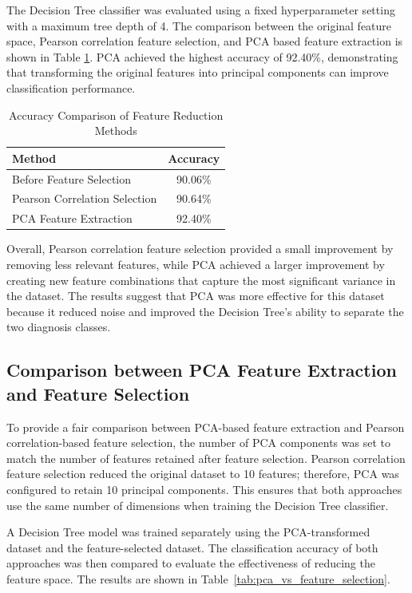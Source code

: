 \documentclass[a4paper,12pt]{article}
\begin{document}
The Decision Tree classifier was evaluated using a fixed hyperparameter setting with a maximum tree depth of 4. The comparison between the original feature space, Pearson correlation feature selection, and PCA based feature extraction is shown in Table \ref{tab:pca_accuracy}. PCA achieved the highest accuracy of 92.40\%, demonstrating that transforming the original features into principal components can improve classification performance.

\begin{table}
	\centering
	\begin{tabular}{l c}
		\hline
		\textbf{Method} & \textbf{Accuracy} \\
		\hline
		Before Feature Selection & 90.06\% \\
		Pearson Correlation Selection & 90.64\% \\
		PCA Feature Extraction & 92.40\% \\
		\hline
	\end{tabular}
	\caption{Accuracy Comparison of Feature Reduction Methods}
	\label{tab:pca_accuracy}
\end{table}

Overall, Pearson correlation feature selection provided a small improvement by removing less relevant features, while PCA achieved a larger improvement by creating new feature combinations that capture the most significant variance in the dataset. The results suggest that PCA was more effective for this dataset because it reduced noise and improved the Decision Tree's ability to separate the two diagnosis classes.

\subsection{Comparison between PCA Feature Extraction and Feature Selection}

To provide a fair comparison between PCA-based feature extraction and Pearson correlation-based feature selection, the number of PCA components was set to match the number of features retained after feature selection. Pearson correlation feature selection reduced the original dataset to 10 features; therefore, PCA was configured to retain 10 principal components. This ensures that both approaches use the same number of dimensions when training the Decision Tree classifier.

A Decision Tree model was trained separately using the PCA-transformed dataset and the feature-selected dataset. The classification accuracy of both approaches was then compared to evaluate the effectiveness of reducing the feature space. The results are shown in Table~\ref{tab:pca_vs_feature_selection}.
\end{document}

